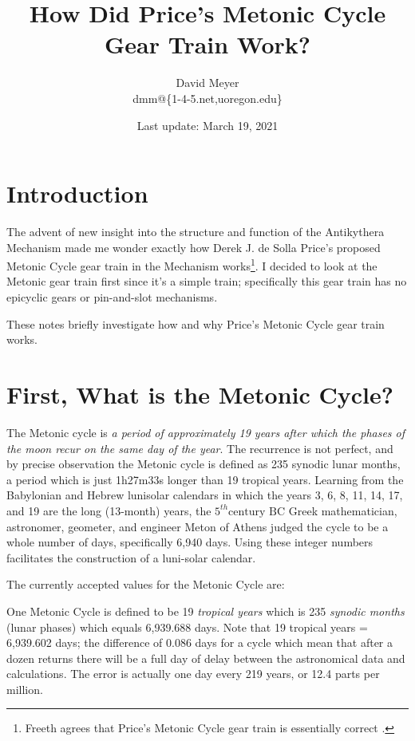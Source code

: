 \documentclass[11pt, oneside]{article}   	%
\title{How Did Price's Metonic Cycle Gear Train Work?}
\author{David Meyer \\ dmm@\{1-4-5.net,uoregon.edu\}}
\date{Last update: March 19, 2021}							%
\theoremstyle{definition}
\begin{document}
\maketitle

\section{Introduction}
The advent of new insight into the structure and function of the Antikythera Mechanism \cite{Freeth2021} made me wonder exactly how 
Derek J. de Solla Price's \cite{wiki:price} proposed Metonic Cycle gear train in the Mechanism works\footnote{Freeth agrees that Price's Metonic Cycle gear train
is essentially correct \cite{Freeth2006}.}. I decided to look at the Metonic gear train first since it's a simple train; specifically this gear train has no epicyclic gears 
or pin-and-slot mechanisms.

\bigskip
\noindent
These notes briefly investigate how and why Price's Metonic Cycle gear train works.

\section{First, What is the Metonic Cycle?}
The Metonic cycle is \emph{a period of approximately 19 years after which the phases of the moon recur on the same day of the year}. The recurrence is not perfect, 
and by precise observation the Metonic cycle is defined as 235 synodic lunar months, a period which is just 1h27m33s longer than 19 tropical years. Learning from the 
Babylonian and Hebrew lunisolar calendars in which the years 3, 6, 8, 11, 14, 17, and 19 are the long (13-month) years, the $5^{th} \text{century BC}$ Greek mathematician, 
astronomer, geometer, and engineer Meton of Athens judged the cycle to be a whole number of days, specifically 6,940 days. Using these integer numbers facilitates the
 construction of a luni-solar calendar.

\bigskip
\noindent
The currently accepted values for the Metonic Cycle are:

\bigskip
\noindent
One Metonic Cycle is defined to be 19 \emph{tropical years} which is 235 \emph{synodic months} (lunar phases) which equals 6,939.688 days. Note that 19 tropical years = 6,939.602 days;
the difference of 0.086 days for a cycle which mean that after a dozen returns there will be a full day of delay between the astronomical data and calculations. 
The error is actually one day every 219 years, or 12.4 parts per million.
\end{document}
